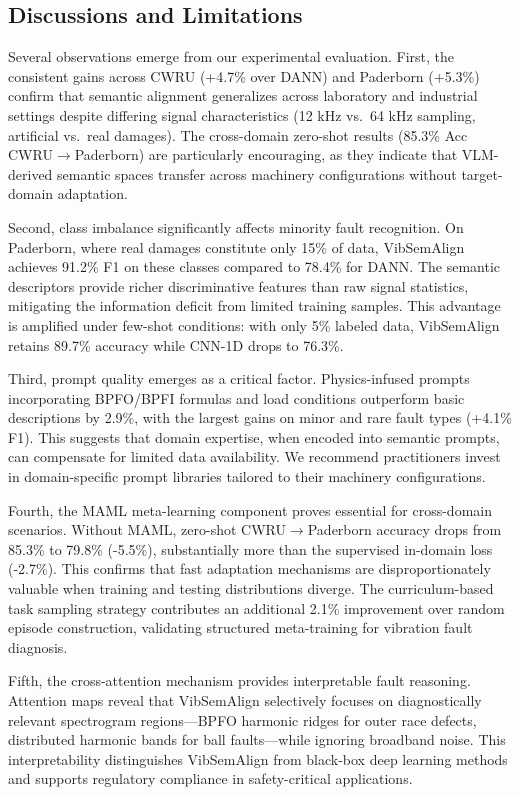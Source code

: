 \subsection{Discussions and Limitations}

Several observations emerge from our experimental evaluation. First, the consistent gains across CWRU (+4.7\% over DANN) and Paderborn (+5.3\%) confirm that semantic alignment generalizes across laboratory and industrial settings despite differing signal characteristics (12 kHz vs.\ 64 kHz sampling, artificial vs.\ real damages). The cross-domain zero-shot results (85.3\% Acc CWRU$\to$Paderborn) are particularly encouraging, as they indicate that VLM-derived semantic spaces transfer across machinery configurations without target-domain adaptation.

Second, class imbalance significantly affects minority fault recognition. On Paderborn, where real damages constitute only 15\% of data, VibSemAlign achieves 91.2\% F1 on these classes compared to 78.4\% for DANN. The semantic descriptors provide richer discriminative features than raw signal statistics, mitigating the information deficit from limited training samples. This advantage is amplified under few-shot conditions: with only 5\% labeled data, VibSemAlign retains 89.7\% accuracy while CNN-1D drops to 76.3\%.

Third, prompt quality emerges as a critical factor. Physics-infused prompts incorporating BPFO/BPFI formulas and load conditions outperform basic descriptions by 2.9\%, with the largest gains on minor and rare fault types (+4.1\% F1). This suggests that domain expertise, when encoded into semantic prompts, can compensate for limited data availability. We recommend practitioners invest in domain-specific prompt libraries tailored to their machinery configurations.

Fourth, the MAML meta-learning component proves essential for cross-domain scenarios. Without MAML, zero-shot CWRU$\to$Paderborn accuracy drops from 85.3\% to 79.8\% (-5.5\%), substantially more than the supervised in-domain loss (-2.7\%). This confirms that fast adaptation mechanisms are disproportionately valuable when training and testing distributions diverge. The curriculum-based task sampling strategy contributes an additional 2.1\% improvement over random episode construction, validating structured meta-training for vibration fault diagnosis.

Fifth, the cross-attention mechanism provides interpretable fault reasoning. Attention maps reveal that VibSemAlign selectively focuses on diagnostically relevant spectrogram regions---BPFO harmonic ridges for outer race defects, distributed harmonic bands for ball faults---while ignoring broadband noise. This interpretability distinguishes VibSemAlign from black-box deep learning methods and supports regulatory compliance in safety-critical applications.

